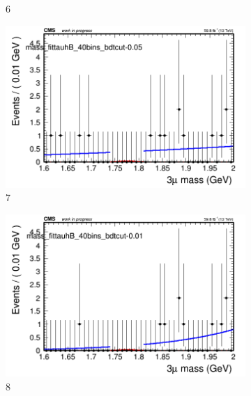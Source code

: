 \begin{figure}[h!]
\begin{subfigure}{0.2\textwidth}
        \caption{6}
    \end{subfigure}
    \begin{subfigure}{0.2\textwidth}
        \includegraphics[width=\textwidth]{power_law/plots/tauhB/massfit_tauhB_40bins_bdtcut-0.05.png}
        \caption{7}
    \end{subfigure}
    \begin{subfigure}{0.2\textwidth}
        \includegraphics[width=\textwidth]{power_law/plots/tauhB/massfit_tauhB_40bins_bdtcut-0.01.png}
        \caption{8}
    \end{subfigure}
    \begin{subfigure}{0.2\textwidth}

\end{subfigure}
\end{figure}
